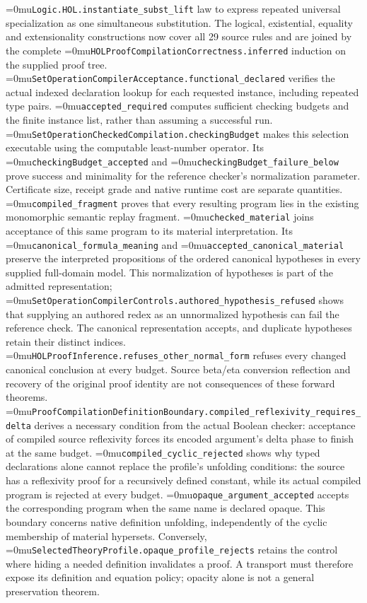 \documentclass[11pt]{article}
\newcommand{\leanname}[1]{\textup{\Urlmuskip=0mu\relax\nolinkurl{#1}}}
\theoremstyle{definition}
\theoremstyle{remark}
\begin{document}
\leanname{Logic.HOL.instantiate_subst_lift} law to express repeated universal
specialization as one simultaneous substitution. The logical, existential,
equality and extensionality constructions now cover all 29 source rules and
are joined by the complete \leanname{HOLProofCompilationCorrectness.inferred}
induction on the supplied proof tree.
\leanname{SetOperationCompilerAcceptance.functional_declared} verifies the
actual indexed declaration lookup for each requested instance, including
repeated type pairs. \leanname{accepted_required} computes sufficient
checking budgets and the finite instance list, rather than assuming a
successful run. \leanname{SetOperationCheckedCompilation.checkingBudget}
makes this selection executable using the computable least-number operator.
Its \leanname{checkingBudget_accepted} and \leanname{checkingBudget_failure_below}
prove success and minimality for the reference checker's normalization
parameter. Certificate size, receipt grade and native runtime cost are
separate quantities. \leanname{compiled_fragment} proves that every resulting
program lies in the existing monomorphic semantic replay fragment.
\leanname{checked_material} joins acceptance of this same program to its
material interpretation. Its \leanname{canonical_formula_meaning} and
\leanname{accepted_canonical_material} preserve the interpreted propositions
of the ordered canonical hypotheses in every supplied full-domain model.
This normalization of hypotheses is part of the admitted representation;
\leanname{SetOperationCompilerControls.authored_hypothesis_refused} shows
that supplying an authored redex as an unnormalized hypothesis can fail the
reference check. The canonical representation accepts, and duplicate
hypotheses retain their distinct indices.
\leanname{HOLProofInference.refuses_other_normal_form} refuses every changed
canonical conclusion at every budget. Source beta/eta conversion reflection
and recovery of the original proof identity are not consequences of these
forward theorems.
\leanname{ProofCompilationDefinitionBoundary.compiled_reflexivity_requires_delta}
derives a necessary condition from the actual Boolean checker: acceptance of
compiled source reflexivity forces its encoded argument's delta phase to
finish at the same budget.
\leanname{compiled_cyclic_rejected}
shows why typed declarations alone cannot replace the profile's unfolding
conditions: the source has a reflexivity proof for a recursively defined
constant, while its actual compiled program is rejected at every budget.
\leanname{opaque_argument_accepted} accepts the corresponding program when
the same name is declared opaque. This boundary concerns native definition
unfolding, independently of the cyclic membership of material hypersets.
Conversely, \leanname{SelectedTheoryProfile.opaque_profile_rejects} retains
the control where hiding a needed definition invalidates a proof. A
transport must therefore expose its definition and equation policy; opacity
alone is not a general preservation theorem.
\end{document}
